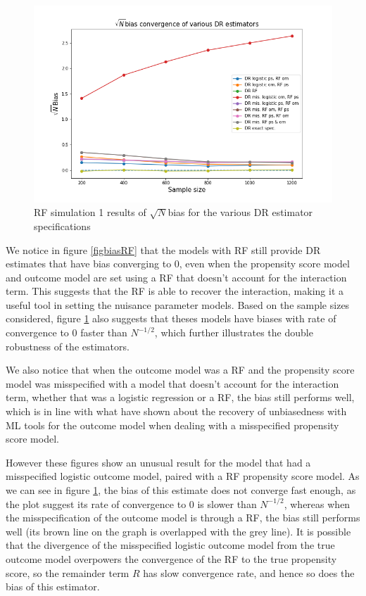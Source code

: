 \documentclass[12pt,twoside]{article}
\begin{document}
\begin{figure} 
    \centering
    \includegraphics[width = 0.9\columnwidth]{figures/sqrtnRF.png}
    \caption{RF simulation 1 results of $\sqrt{N}$bias for the various DR estimator specifications}
    \label{figsqrtnRF}
\end{figure}

We notice in figure \ref{figbiasRF} that the models with RF still provide DR estimates that have bias converging to 0, even when the propensity score model and outcome model are set using a RF that doesn't account for the interaction term. This suggests that the RF is able to recover the interaction, making it a useful tool in setting the nuisance parameter models. Based on the sample sizes considered, figure \ref{figsqrtnRF} also suggests that theses models have biases with rate of convergence to 0 faster than $N^{-1/2}$, which further illustrates the double robustness of the estimators.

We also notice that when the outcome model was a RF and the propensity score model was misspecified with a model that doesn't account for the interaction term, whether that was a logistic regression or a RF, the bias still performs well, which is in line with what \citet{ps_SL} have shown about the recovery of unbiasedness with ML tools for the outcome model when dealing with a misspecified propensity score model. 

However these figures show an unusual result for the model that had a misspecified logistic outcome model, paired with a RF propensity score model. As we can see in figure \ref{figsqrtnRF}, the bias of this estimate does not converge fast enough, as the plot suggest its rate of convergence to 0 is slower than $N^{-1/2}$, whereas when the misspecification of the outcome model is through a RF, the bias still performs well (its brown line on the graph is overlapped with the grey line). It is possible that the divergence of the misspecified logistic outcome model from the true outcome model overpowers the convergence of the RF to the true propensity score, so the \cite{benkeser2017} remainder term $R$ has slow convergence rate, and hence so does the bias of this estimator.
\end{document}
